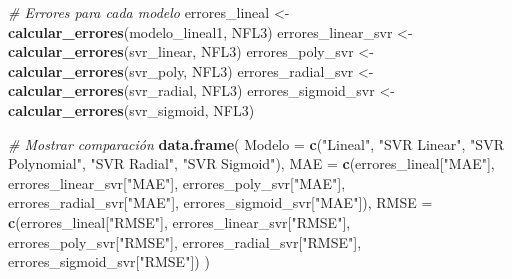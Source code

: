 \documentclass[
]{article}
\newenvironment{Shaded}{\begin{snugshade}}{\end{snugshade}}
\newcommand{\AttributeTok}[1]{\textcolor[rgb]{0.13,0.29,0.53}{#1}}
\newcommand{\CommentTok}[1]{\textcolor[rgb]{0.56,0.35,0.01}{\textit{#1}}}
\newcommand{\ControlFlowTok}[1]{\textcolor[rgb]{0.13,0.29,0.53}{\textbf{#1}}}
\newcommand{\DecValTok}[1]{\textcolor[rgb]{0.00,0.00,0.81}{#1}}
\newcommand{\FunctionTok}[1]{\textcolor[rgb]{0.13,0.29,0.53}{\textbf{#1}}}
\newcommand{\NormalTok}[1]{#1}
\newcommand{\OtherTok}[1]{\textcolor[rgb]{0.56,0.35,0.01}{#1}}
\newcommand{\SpecialCharTok}[1]{\textcolor[rgb]{0.81,0.36,0.00}{\textbf{#1}}}
\newcommand{\StringTok}[1]{\textcolor[rgb]{0.31,0.60,0.02}{#1}}
\begin{document}
\begin{Shaded}
\end{Shaded}

\begin{Shaded}
\begin{Highlighting}[]
\CommentTok{\# Errores para cada modelo}
\NormalTok{errores\_lineal }\OtherTok{\textless{}{-}} \FunctionTok{calcular\_errores}\NormalTok{(modelo\_lineal1, NFL3)}
\NormalTok{errores\_linear\_svr }\OtherTok{\textless{}{-}} \FunctionTok{calcular\_errores}\NormalTok{(svr\_linear, NFL3)}
\NormalTok{errores\_poly\_svr }\OtherTok{\textless{}{-}} \FunctionTok{calcular\_errores}\NormalTok{(svr\_poly, NFL3)}
\NormalTok{errores\_radial\_svr }\OtherTok{\textless{}{-}} \FunctionTok{calcular\_errores}\NormalTok{(svr\_radial, NFL3)}
\NormalTok{errores\_sigmoid\_svr }\OtherTok{\textless{}{-}} \FunctionTok{calcular\_errores}\NormalTok{(svr\_sigmoid, NFL3)}

\CommentTok{\# Mostrar comparación}
\FunctionTok{data.frame}\NormalTok{(}
  \AttributeTok{Modelo =} \FunctionTok{c}\NormalTok{(}\StringTok{"Lineal"}\NormalTok{, }\StringTok{"SVR Linear"}\NormalTok{, }\StringTok{"SVR Polynomial"}\NormalTok{, }\StringTok{"SVR Radial"}\NormalTok{, }\StringTok{"SVR Sigmoid"}\NormalTok{),}
  \AttributeTok{MAE =} \FunctionTok{c}\NormalTok{(errores\_lineal[}\StringTok{"MAE"}\NormalTok{], errores\_linear\_svr[}\StringTok{"MAE"}\NormalTok{], errores\_poly\_svr[}\StringTok{"MAE"}\NormalTok{],}
\NormalTok{          errores\_radial\_svr[}\StringTok{"MAE"}\NormalTok{], errores\_sigmoid\_svr[}\StringTok{"MAE"}\NormalTok{]),}
  \AttributeTok{RMSE =} \FunctionTok{c}\NormalTok{(errores\_lineal[}\StringTok{"RMSE"}\NormalTok{], errores\_linear\_svr[}\StringTok{"RMSE"}\NormalTok{], errores\_poly\_svr[}\StringTok{"RMSE"}\NormalTok{],}
\NormalTok{           errores\_radial\_svr[}\StringTok{"RMSE"}\NormalTok{], errores\_sigmoid\_svr[}\StringTok{"RMSE"}\NormalTok{])}
\NormalTok{)}
\end{Highlighting}
\end{Shaded}
\end{document}
